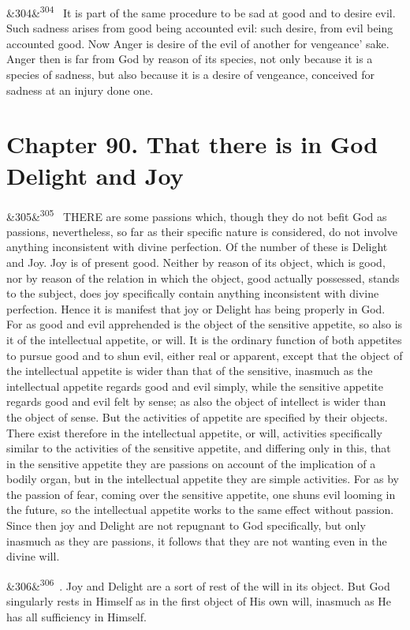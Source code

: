\documentclass[12pt]{article}
\newcommand{\para}[1][]{\par\noindent\ifx&#1&\else\textsuperscript{\footnotesize #1}~\fi}
\begin{document}
\para[304] It is part of the same procedure to be sad at good and to desire evil. Such sadness arises from good being accounted evil: such desire, from evil being accounted good. Now Anger is desire of the evil of another for vengeance' sake. Anger then is far from God by reason of its species, not only because it is a species of sadness, but also because it is a desire of vengeance, conceived for sadness at an injury done one.

\section*{Chapter 90. That there is in God Delight and Joy}

\para[305] THERE are some passions which, though they do not befit God as passions, nevertheless, so far as their specific nature is considered, do not involve anything inconsistent with divine perfection. Of the number of these is Delight and Joy. Joy is of present good. Neither by reason of its object, which is good, nor by reason of the relation in which the object, good actually possessed, stands to the subject, does joy specifically contain anything inconsistent with divine perfection. Hence it is manifest that joy or Delight has being properly in God. For as good and evil apprehended is the object of the sensitive appetite, so also is it of the intellectual appetite, or will. It is the ordinary function of both appetites to pursue good and to shun evil, either real or apparent, except that the object of the intellectual appetite is wider than that of the sensitive, inasmuch as the intellectual appetite regards good and evil simply, while the sensitive appetite regards good and evil felt by sense; as also the object of intellect is wider than the object of sense. But the activities of appetite are specified by their objects. There exist therefore in the intellectual appetite, or will, activities specifically similar to the activities of the sensitive appetite, and differing only in this, that in the sensitive appetite they are passions on account of the implication of a bodily organ, but in the intellectual appetite they are simple activities. For as by the passion of fear, coming over the sensitive appetite, one shuns evil looming in the future, so the intellectual appetite works to the same effect without passion. Since then joy and Delight are not repugnant to God specifically, but only inasmuch as they are passions, it follows that they are not wanting even in the divine will.

\para[306] 2. Joy and Delight are a sort of rest of the will in its object. But God singularly rests in Himself as in the first object of His own will, inasmuch as He has all sufficiency in Himself.
\end{document}
